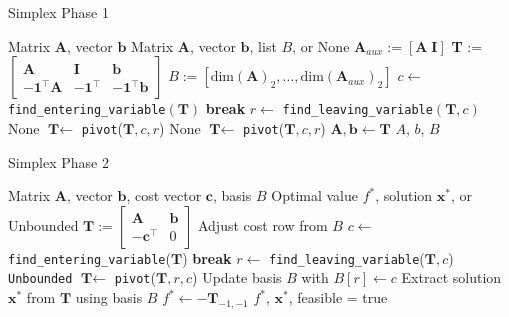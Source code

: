 \documentclass[conference]{IEEEtran}
\begin{document}
\begin{algorithm}
\caption{Simplex Phase 1}
\label{alg:phase1}
\begin{algorithmic}[1]
\Require Matrix $\textbf{A}$, vector $\textbf{b}$
\Ensure  Matrix $\textbf{A}$, vector $\textbf{b}$, list $B$, or None
\State $\textbf{A}_{aux} := [\textbf{A} \; \textbf{I}]$
\State \textbf{T} := 
$\begin{bmatrix}
\textbf{A} & \textbf{I} & \textbf{b} \\
-\mathbf{1}^\top \textbf{A} & -\mathbf{1}^\top & -\mathbf{1}^\top \textbf{b}
\end{bmatrix}$
\State $B := [\text{dim}(\textbf{A})_2,\dots,\text{dim}(\textbf{A}_{aux})_2]$
    \State $c \gets $ \texttt{find\_entering\_variable}$(\textbf{T})$
        \State \textbf{break}
    \EndIf
    \State  $r \gets $ \texttt{find\_leaving\_variable}$(\textbf{T},c)$
        \State \Return None 
    \EndIf
    \State $\textbf{T} \gets $ \texttt{pivot}($\textbf{T},c,r$)
\EndWhile
{} 
    \State \Return None 
\EndIf
\State $\textbf{T} \gets $ \texttt{pivot}($\textbf{T},c,r$) 
\State $\textbf{A}, \textbf{b} \gets \textbf{T}$
\State \Return $A$, $b$, $B$
\end{algorithmic}
\end{algorithm}

\begin{algorithm}
    \caption{Simplex Phase 2}
    \label{alg:phase2}
    \begin{algorithmic}[1]
    \Require Matrix $\textbf{A}$, vector $\textbf{b}$, cost vector $\textbf{c}$, basis $B$
    \Ensure Optimal value $f^*$, solution $\textbf{x}^*$, or Unbounded
    \State $\textbf{T} := \begin{bmatrix} \textbf{A} & \textbf{b} \\ -\textbf{c}^\top & 0 \end{bmatrix}$
    \State Adjust cost row from $B$ 
        \State $c \gets$ \texttt{find\_entering\_variable}($\textbf{T}$)
            \State \textbf{break} 
        \EndIf
        \State $r \gets$ \texttt{find\_leaving\_variable}($\textbf{T}, c$)
            \State \Return \texttt{Unbounded}
        \EndIf
        \State $\textbf{T} \gets$ \texttt{pivot}($\textbf{T}, r, c$)
        \State Update basis $B$ with $B[r] \gets c$
    \EndWhile
    \State Extract solution $\textbf{x}^*$ from $\textbf{T}$ using basis $B$
    \State $f^* \gets -\textbf{T}_{-1, -1}$ 
    \State \Return $f^*$, $\textbf{x}^*$, feasible = true
    \end{algorithmic}
\end{algorithm}
\end{document}
